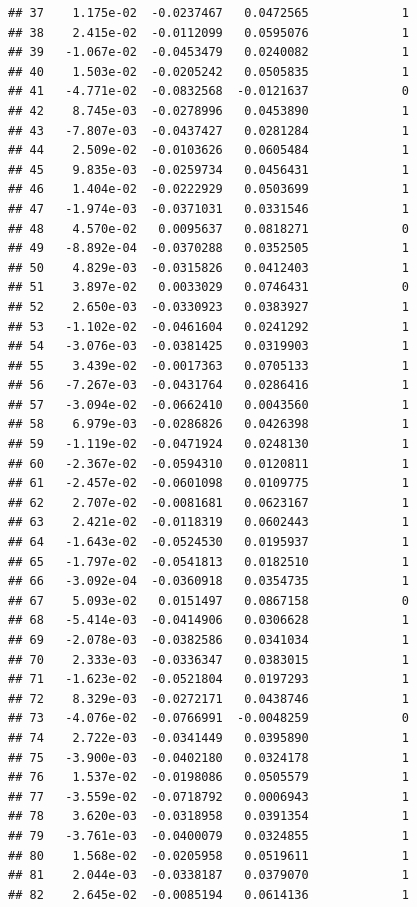 \documentclass[12pt]{article}\usepackage[]{graphicx}\usepackage[]{xcolor}
\makeatletter
\newenvironment{kframe}{%
 \def\at@end@of@kframe{}%
 \ifinner\ifhmode%
  \def\at@end@of@kframe{\end{minipage}}%
  \begin{minipage}{\columnwidth}%
 \fi\fi%
 \def\FrameCommand##1{\hskip\@totalleftmargin \hskip-\fboxsep
 \colorbox{shadecolor}{##1}\hskip-\fboxsep
     \hskip-\linewidth \hskip-\@totalleftmargin \hskip\columnwidth}%
 \MakeFramed {\advance\hsize-\width
   \@totalleftmargin\z@ \linewidth\hsize
   \@setminipage}}%
 {\par\unskip\endMakeFramed%
 \at@end@of@kframe}
\newenvironment{knitrout}{}{} %
\makeatother
\begin{document}
\begin{knitrout}
\begin{kframe}
\begin{verbatim}
## 37    1.175e-02  -0.0237467   0.0472565             1
## 38    2.415e-02  -0.0112099   0.0595076             1
## 39   -1.067e-02  -0.0453479   0.0240082             1
## 40    1.503e-02  -0.0205242   0.0505835             1
## 41   -4.771e-02  -0.0832568  -0.0121637             0
## 42    8.745e-03  -0.0278996   0.0453890             1
## 43   -7.807e-03  -0.0437427   0.0281284             1
## 44    2.509e-02  -0.0103626   0.0605484             1
## 45    9.835e-03  -0.0259734   0.0456431             1
## 46    1.404e-02  -0.0222929   0.0503699             1
## 47   -1.974e-03  -0.0371031   0.0331546             1
## 48    4.570e-02   0.0095637   0.0818271             0
## 49   -8.892e-04  -0.0370288   0.0352505             1
## 50    4.829e-03  -0.0315826   0.0412403             1
## 51    3.897e-02   0.0033029   0.0746431             0
## 52    2.650e-03  -0.0330923   0.0383927             1
## 53   -1.102e-02  -0.0461604   0.0241292             1
## 54   -3.076e-03  -0.0381425   0.0319903             1
## 55    3.439e-02  -0.0017363   0.0705133             1
## 56   -7.267e-03  -0.0431764   0.0286416             1
## 57   -3.094e-02  -0.0662410   0.0043560             1
## 58    6.979e-03  -0.0286826   0.0426398             1
## 59   -1.119e-02  -0.0471924   0.0248130             1
## 60   -2.367e-02  -0.0594310   0.0120811             1
## 61   -2.457e-02  -0.0601098   0.0109775             1
## 62    2.707e-02  -0.0081681   0.0623167             1
## 63    2.421e-02  -0.0118319   0.0602443             1
## 64   -1.643e-02  -0.0524530   0.0195937             1
## 65   -1.797e-02  -0.0541813   0.0182510             1
## 66   -3.092e-04  -0.0360918   0.0354735             1
## 67    5.093e-02   0.0151497   0.0867158             0
## 68   -5.414e-03  -0.0414906   0.0306628             1
## 69   -2.078e-03  -0.0382586   0.0341034             1
## 70    2.333e-03  -0.0336347   0.0383015             1
## 71   -1.623e-02  -0.0521804   0.0197293             1
## 72    8.329e-03  -0.0272171   0.0438746             1
## 73   -4.076e-02  -0.0766991  -0.0048259             0
## 74    2.722e-03  -0.0341449   0.0395890             1
## 75   -3.900e-03  -0.0402180   0.0324178             1
## 76    1.537e-02  -0.0198086   0.0505579             1
## 77   -3.559e-02  -0.0718792   0.0006943             1
## 78    3.620e-03  -0.0318958   0.0391354             1
## 79   -3.761e-03  -0.0400079   0.0324855             1
## 80    1.568e-02  -0.0205958   0.0519611             1
## 81    2.044e-03  -0.0338187   0.0379070             1
## 82    2.645e-02  -0.0085194   0.0614136             1

\end{verbatim}
\end{kframe}
\end{knitrout}
\end{document}
